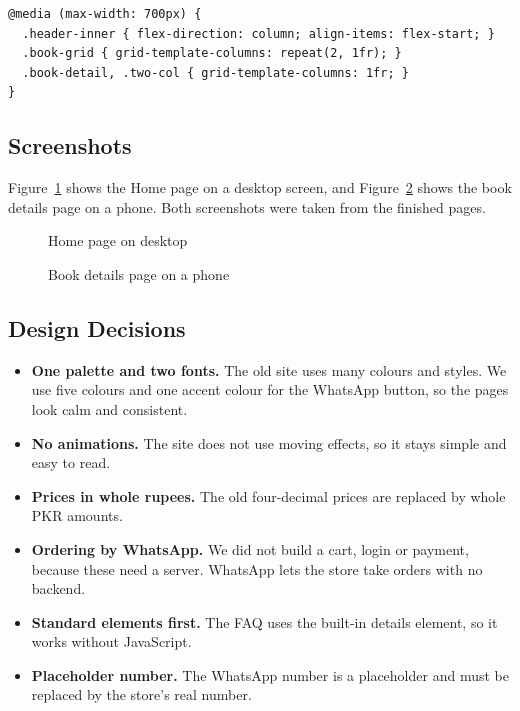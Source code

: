 \documentclass[12pt,a4paper]{article}
\begin{document}
\begin{lstlisting}[caption={Media query for phones and small screens},label={lst:media}]
@media (max-width: 700px) {
  .header-inner { flex-direction: column; align-items: flex-start; }
  .book-grid { grid-template-columns: repeat(2, 1fr); }
  .book-detail, .two-col { grid-template-columns: 1fr; }
}
\end{lstlisting}

\subsection{Screenshots}
Figure~\ref{fig:shot-home} shows the Home page on a desktop screen, and Figure~\ref{fig:shot-mobile} shows the book details page on a phone. Both screenshots were taken from the finished pages.

\begin{figure}[H]
\centering
\caption{Home page on desktop}
\label{fig:shot-home}
\end{figure}

\begin{figure}[H]
\centering
{}
\caption{Book details page on a phone}
\label{fig:shot-mobile}
\end{figure}

\subsection{Design Decisions}
\begin{itemize}
  \item \textbf{One palette and two fonts.} The old site uses many colours and styles. We use five colours and one accent colour for the WhatsApp button, so the pages look calm and consistent.
  \item \textbf{No animations.} The site does not use moving effects, so it stays simple and easy to read.
  \item \textbf{Prices in whole rupees.} The old four-decimal prices are replaced by whole PKR amounts.
  \item \textbf{Ordering by WhatsApp.} We did not build a cart, login or payment, because these need a server. WhatsApp lets the store take orders with no backend.
  \item \textbf{Standard elements first.} The FAQ uses the built-in details element, so it works without JavaScript.
  \item \textbf{Placeholder number.} The WhatsApp number is a placeholder and must be replaced by the store's real number.
\end{itemize}
\end{document}
